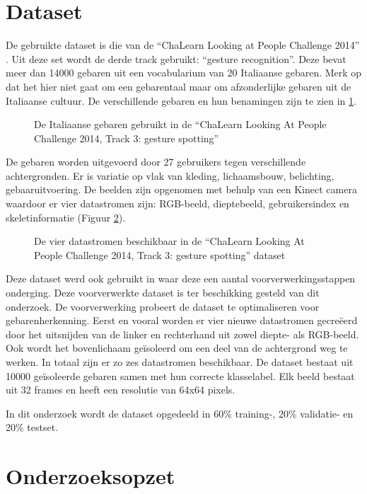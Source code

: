 \section{Dataset}
De gebruikte dataset is die van de ``ChaLearn Looking at People Challenge 2014'' \cite{escalera_chalearn_2014}. Uit deze set wordt de derde track gebruikt: ``gesture recognition''. Deze bevat meer dan 14000 gebaren uit een vocabularium van 20 Italiaanse gebaren. Merk op dat het hier niet gaat om een gebarentaal maar om afzonderlijke gebaren uit de Italiaanse cultuur. De verschillende gebaren en hun benamingen zijn te zien in \ref{fig:gebaren}.
\begin{figure}
	\centering
	\def\svgwidth{\columnwidth}
	
	\caption{De Italiaanse gebaren gebruikt in de ``ChaLearn Looking At People Challenge 2014, Track 3: gesture spotting''}
	\label{fig:gebaren}
\end{figure}
\npar De gebaren worden uitgevoerd door 27 gebruikers tegen verschillende achtergronden. Er is variatie op vlak van kleding, lichaamsbouw, belichting, gebaaruitvoering. De beelden zijn opgenomen met behulp van een Kinect camera waardoor er vier datastromen zijn: RGB-beeld, dieptebeeld, gebruikersindex en skeletinformatie (Figuur \ref{fig:chalearn-data}).
\begin{figure}
	\centering
	\def\svgwidth{\columnwidth}
	
	\caption{De vier datastromen beschikbaar in de ``ChaLearn Looking At People Challenge 2014, Track 3: gesture spotting'' dataset}
	\label{fig:chalearn-data}
\end{figure}
\npar Deze dataset werd ook gebruikt in \cite{lionel} waar deze een aantal voorverwerkingsstappen onderging. Deze voorverwerkte dataset is ter beschikking gesteld van dit onderzoek. De voorverwerking probeert de dataset te optimaliseren voor gebarenherkenning. Eerst en vooral worden er vier nieuwe datastromen gecre\"eerd door het uitsnijden van de linker en rechterhand uit zowel diepte- als RGB-beeld. Ook wordt het bovenlichaam ge\"isoleerd om een deel van de achtergrond weg te werken. In totaal zijn er zo zes datastromen beschikbaar. De dataset bestaat uit 10000 ge\"isoleerde gebaren samen met hun correcte klasselabel. Elk beeld bestaat uit 32 frames en heeft een resolutie van 64x64 pixels.

\npar In dit onderzoek wordt de dataset opgedeeld in 60\% training-, 20\% validatie- en 20\% testset.


\section{Onderzoeksopzet}

